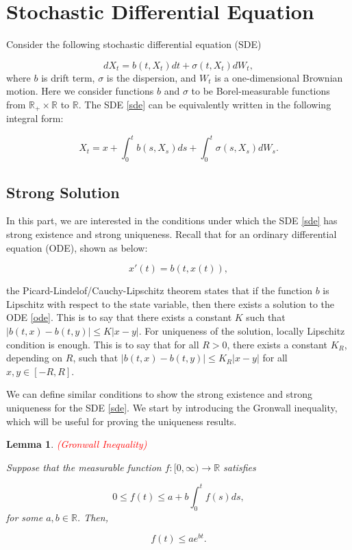 \documentclass{article}
\newtheorem{lemma}{Lemma}
\begin{document}
    \section{Stochastic Differential Equation}

Consider the following stochastic differential equation (SDE)

\begin{equation} \label{sde}
dX_t = b(t,X_t)dt + \sigma(t,X_t)dW_t,
\end{equation}
where $b$ is drift term, $\sigma$ is the dispersion, and $W_t$ is a one-dimensional Brownian motion. Here we consider functions $b$ and $\sigma$ to be Borel-measurable functions from $\mathbb{R}_+\times\mathbb{R}$ to $\mathbb{R}$. The SDE \eqref{sde} can be equivalently written in the following integral form:

\begin{equation*}
X_t = x + \int_0^t b(s,X_s)ds + \int^t_0 \sigma(s,X_s)dW_s.
\end{equation*}

\subsection{Strong Solution}
In this part, we are interested in the conditions under which the SDE \eqref{sde} has strong existence and strong uniqueness. Recall that for an ordinary differential equation (ODE), shown as below:

\begin{equation} \label{ode}
x'(t) = b(t,x(t)),
\end{equation}

the Picard-Lindelof/Cauchy-Lipschitz theorem states that if the function $b$ is Lipschitz with respect to the state variable, then there exists a solution to the ODE \eqref{ode}. This is to say that there exists a constant $K$ such that $|b(t,x)-b(t,y)|\leq K|x-y|$. For uniqueness of the solution, locally Lipschitz condition is enough. This is to say that for all $R>0$, there exists a constant $K_R$, depending on $R$, such that $|b(t,x)-b(t,y)|\leq K_R|x-y|$ for all $x,y\in[-R,R]$.

We can define similar conditions to show the strong existence and strong uniqueness for the SDE \eqref{sde}. We start by introducing the Gronwall inequality, which will be useful for proving the uniqueness results.
 
\begin{lemma} \label{lemma:gronwall} \textcolor{red}{(Gronwall Inequality)}

Suppose that the measurable function $f:[0,\infty)\rightarrow\mathbb{R}$ satisfies

\begin{equation*}
0\leq f(t)\leq a+b\int^t_0 f(s)ds,
\end{equation*}
for some $a,b\in\mathbb{R}$. Then, 

\begin{equation*}
f(t)\leq ae^{bt}.
\end{equation*}

\end{lemma}
\end{document}
